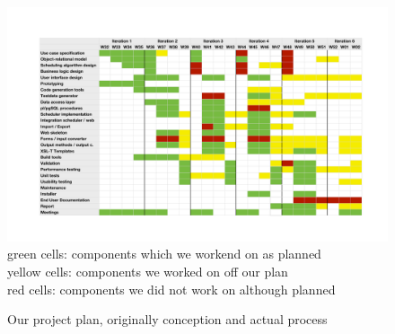 \pagebreak

\begin{figure}[t]
	\includegraphics[width=\columnwidth]{images/gantt.pdf}
	{\color{YellowGreen} green} cells: components which we workend on as planned \\ {\color{Goldenrod} yellow} cells: components we worked on off our plan \\ {\color{BrickRed} red} cells: components we did not work on although planned
	\caption{Our project plan, originally conception and actual process}
	\label{fig:gantt-chart}
\end{figure}

